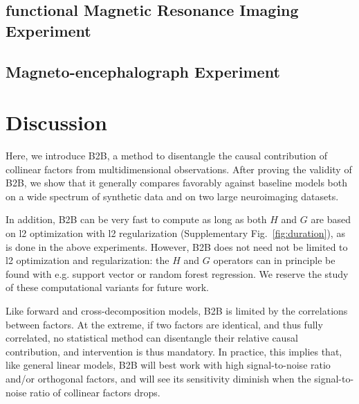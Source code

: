 \documentclass[preprint,12pt,3p]{elsarticle}
\begin{document}
\subsection{functional Magnetic Resonance Imaging Experiment}
\label{sec:experiment_fmri}


\subsection{Magneto-encephalograph Experiment}
\label{sec:experiment_real}


\section{Discussion}

Here, we introduce B2B, a method to disentangle the causal contribution of
collinear factors from multidimensional observations. After proving the validity
of B2B, we show that it generally compares favorably against baseline models
both on a wide spectrum of synthetic data and on two large neuroimaging datasets.

In addition, B2B can be very fast to compute as long as both $H$ and $G$ are based
on l2 optimization with l2 regularization (Supplementary
Fig.~\ref{fig:duration}), as is done in the above experiments. However, B2B
does not need not be limited to l2 optimization and regularization: the $H$ and $G$ operators
can in principle be found with e.g. support vector or random forest regression.
We reserve the study of these computational variants for future work.

Like forward and cross-decomposition models, B2B is limited by the correlations
between factors. At the extreme, if two factors are identical, and thus fully
correlated, no statistical method can disentangle their relative causal
contribution, and intervention is thus mandatory. In practice, this implies that, like
general linear models, B2B will best work with high signal-to-noise ratio and/or
orthogonal factors, and will see its sensitivity diminish when the
signal-to-noise ratio of collinear factors drops.
\end{document}
